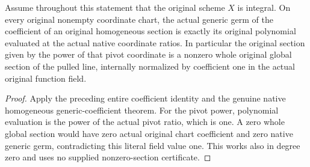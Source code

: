 \begin{theorem}
\label{thm:native-pulled-projective-line-pivot}
\leanok
{}
Assume throughout this statement that the original scheme $X$ is integral.
On every original nonempty coordinate chart, the actual generic germ of the
coefficient of an original homogeneous section is exactly its original
polynomial evaluated at the actual native coordinate ratios. In particular
the original section given by the power of that pivot coordinate is a
nonzero whole original global section of the pulled line, internally
normalized by coefficient one in the actual original function field.
\end{theorem}
\begin{proof}
Apply the preceding entire coefficient identity and the genuine native
homogeneous generic-coefficient theorem. For the pivot power, polynomial
evaluation is the power of the actual pivot ratio, which is one. A zero
whole global section would have zero actual original chart coefficient and
zero native generic germ, contradicting this literal field value one. This
works also in degree zero and uses no supplied nonzero-section certificate.
\end{proof}
